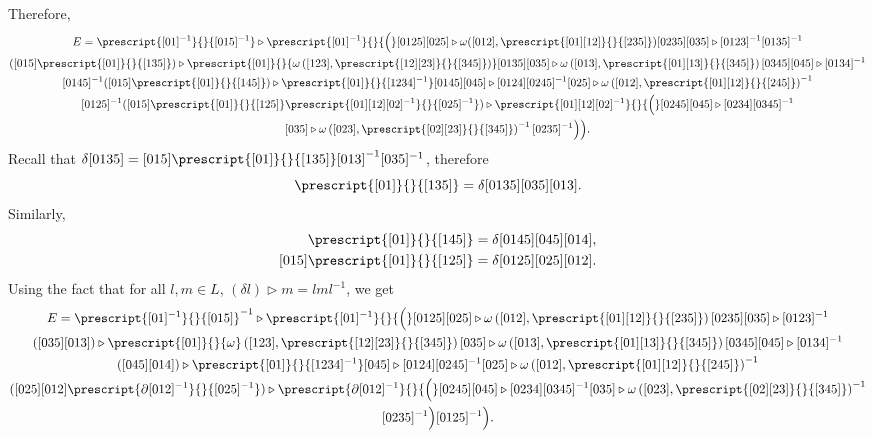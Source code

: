 \documentclass[a4paper, oneside]{amsart}
\numberwithin{equation}{subsection}
\theoremstyle{referencedlemma}
\theoremstyle{plain} %
\theoremstyle{remark}
\begin{document}
Therefore, 
\begin{multline*}
E = \prescript{[01]^{-1}}{}{[015]^{-1}}\triangleright \prescript{[01]^{-1}}{}{\Big (} [0125][025]\triangleright \omega([012], \prescript{[01][12]}{}{[235]} )[0235][035]\triangleright [0123]^{-1}[0135]^{-1} \\
([015]\prescript{[01]}{}{[135]}) \triangleright \prescript{[01]}{}{\omega\left([123], \prescript{[12][23]}{}{[345]}\right)}[0135][035]\triangleright \omega \left( [013], \prescript{[01][13]}{}{[345]}\right) [0345][045]\triangleright [0134]^{-1}\\
[0145]^{-1}([015]\prescript{[01]}{}{[145]})\triangleright \prescript{[01]}{}{[1234]^{-1}}[0145][045]\triangleright [0124][0245]^{-1}[025]\triangleright \omega\left( [012], \prescript{[01][12]}{}{[245]}\right)^{-1}\\
[0125]^{-1} ([015]\prescript{[01]}{}{[125]}\prescript{[01][12][02]^{-1}}{}{[025]^{-1}})\triangleright \prescript{[01][12][02]^{-1}}{}{\Big (} [0245][045]\triangleright [0234][0345]^{-1}\\
[035] \triangleright \omega\left( [023], \prescript{[02][23]}{}{[345]}\right)^{-1}[0235]^{-1} \Big ) \Big ) .
\end{multline*}
Recall that $\delta [0135] = [015]\prescript{[01]}{}{[135]}[013]^{-1}[035]^{-1}$, therefore 
\begin{equation*}
[015]\prescript{[01]}{}{[135]} = \delta [0135] [035][013].
\end{equation*}
Similarly,
\begin{align*}
[015]\prescript{[01]}{}{[145]} & = \delta [0145] [045] [014],\\
[015]\prescript{[01]}{}{[125]} & = \delta [0125] [025] [012]. 
\end{align*}
Using the fact that for all $l,m \in L$, $(\delta l) \triangleright m = lml^{-1}$, we get
\begin{multline*}
E = \prescript{[01]^{-1}}{}{[015]}^{-1}\triangleright \prescript{[01]^{-1}}{}{\Big (} [0125] [025]\triangleright \omega\left([012], \prescript{[01][12]}{}{[235]} \right) [0235] [035]\triangleright [0123]^{-1} \\([035][013]) \triangleright \prescript{[01]}{}{\omega} \left([123], \prescript{[12][23]}{}{[345]} \right)
[035]\triangleright \omega\left([013], \prescript{[01][13]}{}{[345]} \right)[0345][045]\triangleright [0134]^{-1}\\
([045][014])\triangleright \prescript{[01]}{}{[1234]^{-1}} [045]\triangleright [0124][0245]^{-1}[025]\triangleright \omega\left([012], \prescript{[01][12]}{}{[245]} \right)^{-1}\\
([025][012]\prescript{\partial [012]^{-1}}{}{[025]^{-1}}) \triangleright \prescript{\partial [012]^{-1}}{}{\Big (}[0245] [045]\triangleright [0234][0345]^{-1}[035] \triangleright \omega\left([023], \prescript{[02][23]}{}{[345]} \right)^{-1}\\ 
 [0235]^{-1}\Big ) [0125]^{-1}\Big ).
\end{multline*}
\end{document}
